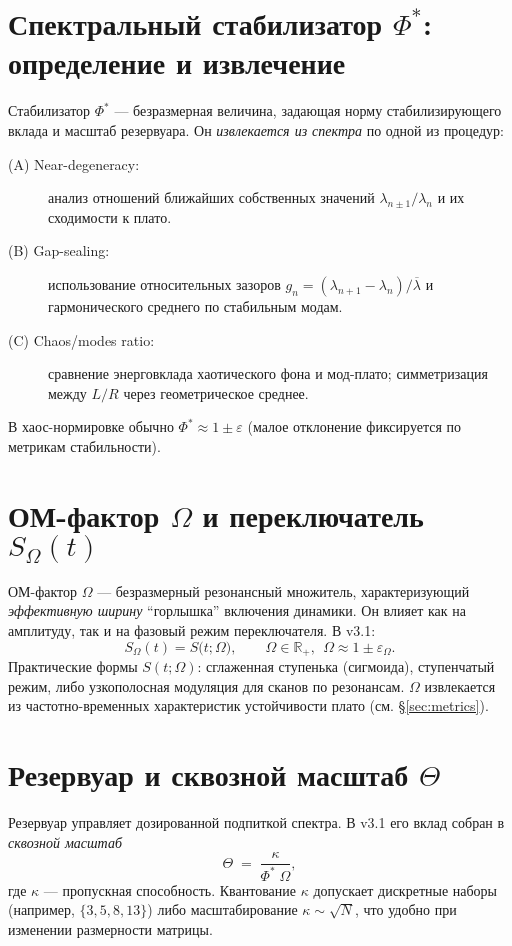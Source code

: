 \documentclass[a4paper,12pt]{article}
\def\Omega{Ω}%
\def\Theta{Θ}%
\def\Phi{Φ}%
\begin{document}
\section[Спектральный стабилизатор Фи*: определение и извлечение]{Спектральный стабилизатор $\Phi^*$: определение и извлечение}\label{sec:phi}
Стабилизатор $\Phi^*$ --- безразмерная величина, задающая норму стабилизирующего вклада и масштаб резервуара. Он \emph{извлекается из спектра} по одной из процедур:
\begin{description}
\item[(A) Near-degeneracy:] анализ отношений ближайших собственных значений $\lambda_{n\pm 1}/\lambda_n$ и их сходимости к плато.
\item[(B) Gap-sealing:] использование относительных зазоров $g_n=(\lambda_{n+1}-\lambda_n)/\overline{\lambda}$ и гармонического среднего по стабильным модам.
\item[(C) Chaos/modes ratio:] сравнение энерговклада хаотического фона и мод-плато; симметризация между $L/R$ через геометрическое среднее.
\end{description}
В хаос-нормировке обычно $\Phi^*\approx 1\pm \varepsilon$ (малое отклонение фиксируется по метрикам стабильности).

\section[ОМ-фактор Ω и переключатель SΩ]{ОМ-фактор \(\Omega\) и переключатель $S_{\Omega}(t)$}\label{sec:switch}
ОМ-фактор $\Omega$ --- безразмерный резонансный множитель, характеризующий \emph{эффективную ширину} ``горлышка'' включения динамики. Он влияет как на амплитуду, так и на фазовый режим переключателя. В v3.1:
\begin{equation}
S_{\Omega}(t)=S\big(t;\Omega\big),\qquad
\Omega \in \mathbb{R}_+,\ \ \Omega\approx 1\pm \varepsilon_{\Omega}.
\end{equation}
Практические формы $S(t;\Omega)$: сглаженная ступенька (сигмоида), ступенчатый режим, либо узкополосная модуляция для сканов по резонансам. $\Omega$ извлекается из частотно-временных характеристик устойчивости плато (см. \S\ref{sec:metrics}).

\section[Резервуар и сквозной масштаб Θ]{Резервуар и сквозной масштаб \(\Theta\)}\label{sec:theta}
Резервуар управляет дозированной подпиткой спектра. В v3.1 его вклад собран в \emph{сквозной масштаб}
\begin{equation}
\Theta \;=\; \frac{\kappa}{\Phi^*\;\Omega},
\label{eq:theta}
\end{equation}
где $\kappa$ --- пропускная способность. Квантование $\kappa$ допускает дискретные наборы (например, $\{3,5,8,13\}$) либо масштабирование $\kappa\sim\sqrt{N}$, что удобно при изменении размерности матрицы.
\end{document}
